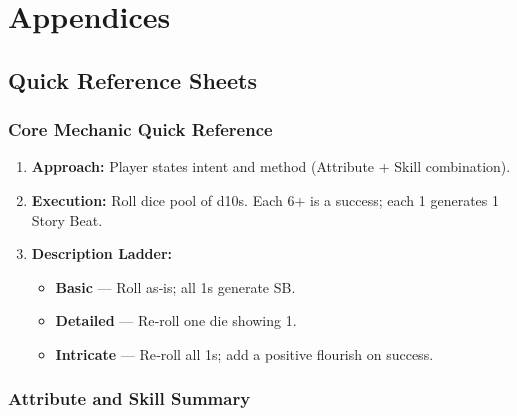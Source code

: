 
\chapter{Appendices}\label{chap:appendices}

\renewcommand{\arraystretch}{1.15}
\newcommand{\feTableStart}{\rowcolors{2}{FeRow}{white}\small}
\newcommand{\feTableEnd}{\rowcolors{2}{}{}}

\appendix

\section{Quick Reference Sheets}\label{sec:quick_reference}

\subsection{Core Mechanic Quick Reference}\label{subsec:core_mechanic_ref}

\begin{enumerate}
    \item \textbf{Approach:} Player states intent and method (Attribute + Skill combination).
    \item \textbf{Execution:} Roll dice pool of d10s. Each 6+ is a success; each 1 generates 1 Story Beat.
    \item \textbf{Description Ladder:}
        \begin{itemize}
            \item \textbf{Basic} --- Roll as‑is; all 1s generate SB.
            \item \textbf{Detailed} --- Re‑roll one die showing 1.
            \item \textbf{Intricate} --- Re‑roll all 1s; add a positive flourish on success.
        \end{itemize}
\end{enumerate}

\subsection{Attribute and Skill Summary}\label{subsec:attributes_skills_ref}

